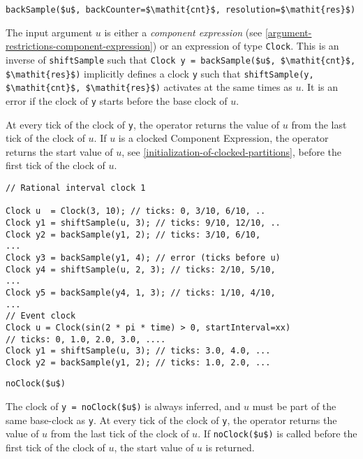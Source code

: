 \begin{operatordefinition}[backSample]
\begin{synopsis}\begin{lstlisting}
backSample($u$, backCounter=$\mathit{cnt}$, resolution=$\mathit{res}$)
\end{lstlisting}\end{synopsis}
\begin{semantics}
The input argument $u$ is either a \emph{component expression} (see \cref{argument-restrictions-component-expression}) or an expression of type \lstinline!Clock!.  This is an inverse of \lstinline!shiftSample! such that \lstinline!Clock y = backSample($u$, $\mathit{cnt}$, $\mathit{res}$)! implicitly defines a clock \lstinline!y! such that \lstinline!shiftSample(y, $\mathit{cnt}$, $\mathit{res}$)! activates at the same times as $u$.  It is an error if the clock of \lstinline!y! starts before the base clock of $u$.

At every tick of the clock of \lstinline!y!, the operator returns the value of $u$ from the last tick of the clock of $u$.  If $u$ is a clocked Component Expression, the operator returns the start value of $u$, see \cref{initialization-of-clocked-partitions}, before the first tick of the clock of $u$.

\begin{example}
\begin{lstlisting}[language=modelica]
// Rational interval clock 1

Clock u  = Clock(3, 10); // ticks: 0, 3/10, 6/10, ..
Clock y1 = shiftSample(u, 3); // ticks: 9/10, 12/10, ..
Clock y2 = backSample(y1, 2); // ticks: 3/10, 6/10,
...
Clock y3 = backSample(y1, 4); // error (ticks before u)
Clock y4 = shiftSample(u, 2, 3); // ticks: 2/10, 5/10,
...
Clock y5 = backSample(y4, 1, 3); // ticks: 1/10, 4/10,
...
// Event clock
Clock u = Clock(sin(2 * pi * time) > 0, startInterval=xx)
// ticks: 0, 1.0, 2.0, 3.0, ....
Clock y1 = shiftSample(u, 3); // ticks: 3.0, 4.0, ...
Clock y2 = backSample(y1, 2); // ticks: 1.0, 2.0, ...
\end{lstlisting}
\end{example}
\end{semantics}
\end{operatordefinition}

\begin{operatordefinition}[noClock]
\begin{synopsis}\begin{lstlisting}
noClock($u$)
\end{lstlisting}\end{synopsis}
\begin{semantics}
The clock of \lstinline!y = noClock($u$)! is always inferred, and $u$ must be part of the same base-clock as \lstinline!y!.  At every tick of the clock of \lstinline!y!, the operator returns the value of $u$ from the last tick of the clock of $u$.  If \lstinline!noClock($u$)! is called before the first tick of the clock of $u$, the start value of $u$ is returned.
\end{semantics}
\end{operatordefinition}

